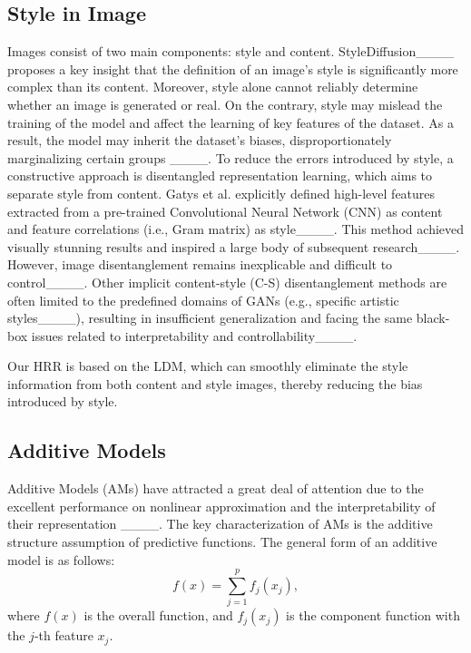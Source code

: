 \subsection{Style in Image}

Images consist of two main components: style and content. StyleDiffusion____ proposes a key insight that the definition of an image's style is significantly more complex than its content. Moreover,  style alone cannot reliably determine whether an image is generated or real. On the contrary, style may mislead the training of the model and affect the learning of key features of the dataset. As a result, the model may inherit the dataset's biases, disproportionately marginalizing certain groups ____.
To reduce the errors introduced by style, a constructive approach is disentangled representation learning, which aims to separate style from content. Gatys et al. explicitly defined high-level features extracted from a pre-trained Convolutional Neural Network (CNN) as content and feature correlations (i.e., Gram matrix) as style____. This method achieved visually stunning results and inspired a large body of subsequent research____. However, image disentanglement remains inexplicable and difficult to control____. Other implicit content-style (C-S) disentanglement methods are often limited to the predefined domains of GANs (e.g., specific artistic styles____), resulting in insufficient generalization and facing the same black-box issues related to interpretability and controllability____.

Our HRR is based on the LDM, which can smoothly eliminate the style information from both content and style images, thereby reducing the bias introduced by style.



\subsection{Additive Models}

Additive Models (AMs) have attracted a great deal of attention due to the excellent performance on nonlinear approximation and the interpretability of their representation ____. The key characterization of AMs is the additive structure assumption of predictive functions.  The general form of an additive model is as follows:
\begin{equation}
	f(x)=\sum^{p}_{j=1}f_j(x_j),
\end{equation}
where $f(x)$ is the overall function, and $f_j(x_{j})$ is the component function with the $j$-th feature $x_j$.

